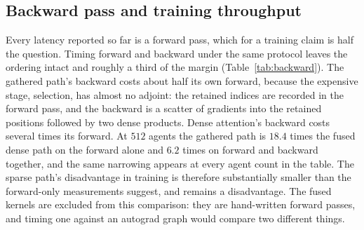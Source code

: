 \subsection{Backward pass and training throughput}
\label{sec:backward}\label{app:backward}


\begin{table}[t]
\centering\small
\caption{Forward, backward and their sum, for the differentiable implementations. The
sparse path's backward is cheap relative to its forward, because selection has
almost no adjoint, so the gap against fused dense narrows without closing.
Restricted to the agent counts that reproduce: below $192$ the forward and the
forward-plus-backward passes are timed in separate interleaved blocks, and the
contention between blocks exceeds the backward's own cost, which at two
configurations produced a difference a backward pass cannot have.}
\label{tab:backward}
\resizebox{\linewidth}{!}{}
\end{table}

Every latency reported so far is a forward pass, which for a training claim is
half the question. Timing forward and backward under the same protocol leaves
the ordering intact and roughly a third of the margin
(Table~\ref{tab:backward}). The gathered path's backward costs about half its
own forward, because the
expensive stage, selection, has almost no adjoint: the retained indices are recorded in the forward pass, and the backward is a scatter of gradients into the retained positions followed by two dense products. Dense attention's backward costs several times its forward. At
$512$ agents the gathered path is $18.4$ times the fused dense path on the
forward alone and $6.2$ times on forward and backward together, and the same
narrowing appears at every agent count in the table. The sparse path's
disadvantage in training is therefore substantially smaller than the
forward-only measurements suggest, and remains a disadvantage. The fused
kernels are excluded from this comparison: they are
hand-written forward passes, and timing one against an autograd graph would
compare two different things.

\begin{table}[t]
\centering\small
\caption{Where one MAPPO iteration spends its time. Differences between
communication implementations are at or below the iteration-to-iteration spread
in the rightmost column.}
\label{tab:trainstep}
\resizebox{\linewidth}{!}{}
\end{table}

